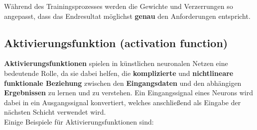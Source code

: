 	Während des Trainingsprozesses werden die Gewichte und Verzerrungen so angepasst, dass das Endresultat möglichst \textbf{genau} den Anforderungen entspricht. \cite{jaai}
	
\subsection{Aktivierungsfunktion (activation function)}

	\textbf{Aktivierungsfunktionen} spielen in künstlichen neuronalen Netzen eine bedeutende Rolle, da sie dabei helfen, die \textbf{komplizierte} und \textbf{nichtlineare funktionale Beziehung} zwischen den \textbf{Eingangsdaten} und den abhängigen \textbf{Ergebnissen} zu lernen und zu verstehen. Ein Eingangssignal eines Neurons wird dabei in ein Ausgangssignal konvertiert, welches anschließend als Eingabe der nächsten Schicht verwendet wird. \cite{ai-united} \\
	
	Einige Beispiele für Aktivierungsfunktionen sind:
	
